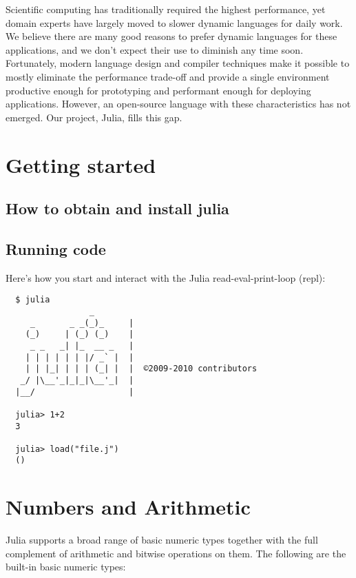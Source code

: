 \documentclass{article}
\title{\thetitle}
\author{
Jeff Bezanson \vspace{0.5em}\\
Stefan Karpinski \vspace{0.5em}\\
Viral Shah \vspace{0.5em}
}
\begin{document}
\maketitle

Scientific computing has traditionally required the highest performance,
yet domain experts have largely moved to slower dynamic languages for
daily work. We believe there are many good reasons to prefer dynamic languages
for these applications, and we don't expect their use to diminish any time
soon. Fortunately, modern language design and compiler techniques make it
possible to mostly eliminate the performance trade-off and provide a
single environment productive enough for prototyping and performant enough
for deploying applications. However, an open-source language with these
characteristics has not emerged. Our project, Julia, fills this gap.

\section{Getting started}
\subsection{How to obtain and install julia}
\subsection{Running code}

Here's how you start and interact with the Julia read-eval-print-loop (repl):

\begin{verbatim}
  $ julia
                 _      
     _       _ _(_)_     |
    (_)     | (_) (_)    |  
     _ _   _| |_  __ _   |
    | | | | | | |/ _` |  |
    | | |_| | | | (_| |  |  ©2009-2010 contributors
   _/ |\__'_|_|_|\__'_|  |  
  |__/                   |

  julia> 1+2
  3

  julia> load("file.j")
  ()
\end{verbatim}

\section{Numbers and Arithmetic}
Julia supports a broad range of basic numeric types together with the full complement of arithmetic and bitwise operations on them.
The following are the built-in basic numeric types:
\end{document}
